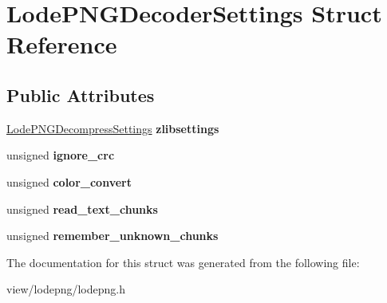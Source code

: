 \hypertarget{struct_lode_p_n_g_decoder_settings}{\section{Lode\-P\-N\-G\-Decoder\-Settings Struct Reference}
\label{struct_lode_p_n_g_decoder_settings}
}
\subsection*{Public Attributes}
\begin{DoxyCompactItemize}
\item 
\hypertarget{struct_lode_p_n_g_decoder_settings_a9ae8fef9880bef97a3e932f8ea942ed8}{\hyperlink{struct_lode_p_n_g_decompress_settings}{Lode\-P\-N\-G\-Decompress\-Settings} {\bfseries zlibsettings}}\label{struct_lode_p_n_g_decoder_settings_a9ae8fef9880bef97a3e932f8ea942ed8}

\item 
\hypertarget{struct_lode_p_n_g_decoder_settings_a6390c403d2a5718242337bbbaf15131d}{unsigned {\bfseries ignore\-\_\-crc}}\label{struct_lode_p_n_g_decoder_settings_a6390c403d2a5718242337bbbaf15131d}

\item 
\hypertarget{struct_lode_p_n_g_decoder_settings_af26f2b29cd338ce4476bee9571a0818a}{unsigned {\bfseries color\-\_\-convert}}\label{struct_lode_p_n_g_decoder_settings_af26f2b29cd338ce4476bee9571a0818a}

\item 
\hypertarget{struct_lode_p_n_g_decoder_settings_aa1212905c3f73d9fffef2c04a220d951}{unsigned {\bfseries read\-\_\-text\-\_\-chunks}}\label{struct_lode_p_n_g_decoder_settings_aa1212905c3f73d9fffef2c04a220d951}

\item 
\hypertarget{struct_lode_p_n_g_decoder_settings_a8775e4fc539dc457916720f52b442f27}{unsigned {\bfseries remember\-\_\-unknown\-\_\-chunks}}\label{struct_lode_p_n_g_decoder_settings_a8775e4fc539dc457916720f52b442f27}

\end{DoxyCompactItemize}


The documentation for this struct was generated from the following file\-:\begin{DoxyCompactItemize}
\item 
view/lodepng/lodepng.\-h\end{DoxyCompactItemize}
